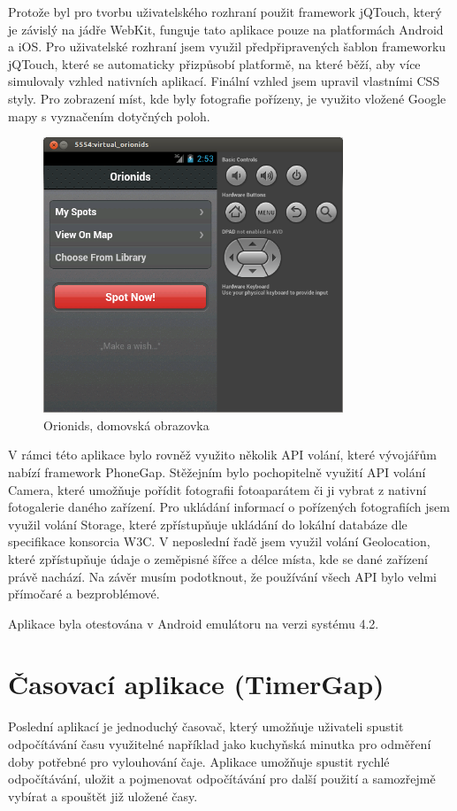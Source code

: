 Protože byl pro tvorbu uživatelského rozhraní použit framework jQTouch, který je závislý na jádře WebKit, funguje tato aplikace pouze na platformách Android a iOS. Pro uživatelské rozhraní jsem využil předpřipravených šablon frameworku jQTouch, které se automaticky přizpůsobí platformě, na které běží, aby více simulovaly vzhled nativních aplikací. Finální vzhled jsem upravil vlastními CSS styly. Pro zobrazení míst, kde byly fotografie pořízeny, je využito vložené Google mapy s vyznačením dotyčných poloh.

\begin{figure}\centering
\includegraphics[width=0.8\textwidth]{orionids_home.png}
\caption{Orionids, domovská obrazovka}
\label{fig:OrionidsHome}
\end{figure}

V rámci této aplikace bylo rovněž využito několik API volání, které vývojářům nabízí framework PhoneGap. Stěžejním bylo pochopitelně využití API volání Camera, které umožňuje pořídit fotografii fotoaparátem či ji vybrat z nativní fotogalerie daného zařízení. Pro ukládání informací o pořízených fotografiích jsem využil volání Storage, které zpřístupňuje ukládání do lokální databáze dle specifikace konsorcia W3C. V neposlední řadě jsem využil volání Geolocation, které zpřístupňuje údaje o zeměpisné šířce a délce místa, kde se dané zařízení právě nachází. Na závěr musím podotknout, že používání všech API bylo velmi přímočaré a bezproblémové.

Aplikace byla otestována v Android emulátoru na verzi systému 4.2.

\section{Časovací aplikace (TimerGap)}
Poslední aplikací je jednoduchý časovač, který umožňuje uživateli spustit odpočítávání času využitelné například jako kuchyňská minutka pro odměření doby potřebné pro vylouhování čaje. Aplikace umožňuje spustit rychlé odpočítávání, uložit a pojmenovat odpočítávání pro další použití a samozřejmě vybírat a spouštět již uložené časy.

